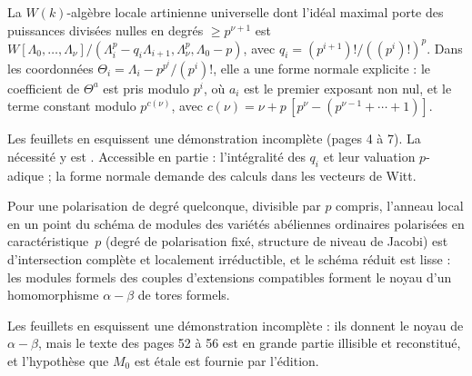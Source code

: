 \begin{encadre}
\begin{theoreme*}\nonverifie
La $W(k)$-algèbre locale artinienne universelle dont l'idéal maximal porte des puissances divisées nulles en degrés $\geq p^{\nu+1}$ est $W[\Lambda_0, \ldots, \Lambda_\nu]/(\Lambda_i^p - q_i\Lambda_{i+1}, \Lambda_\nu^p, \Lambda_0 - p)$, avec $q_i = (p^{i+1})!/((p^i)!)^p$. Dans les coordonnées $\Theta_i = \Lambda_i - p^{p^i}/(p^i)!$, elle a une forme normale explicite : le coefficient de $\Theta^a$ est pris modulo $p^i$, où $a_i$ est le premier exposant non nul, et le terme constant modulo $p^{c(\nu)}$, avec $c(\nu) = \nu + p\,[p^\nu - (p^{\nu-1} + \cdots + 1)]$.
\end{theoreme*}
\end{encadre}
{\small Les feuillets en esquissent une démonstration incomplète (pages 4 à 7). La nécessité y est . Accessible en partie : l'intégralité des $q_i$ et leur valuation $p$-adique ; la forme normale demande des calculs dans les vecteurs de Witt.\par}

\begin{encadre}
\begin{theoreme*}\nonverifie
Pour une polarisation de degré quelconque, divisible par $p$ compris, l'anneau local en un point du schéma de modules des variétés abéliennes ordinaires polarisées en caractéristique~$p$ (degré de polarisation fixé, structure de niveau de Jacobi) est d'intersection complète et localement irréductible, et le schéma réduit est lisse : les modules formels des couples d'extensions compatibles forment le noyau d'un homomorphisme $\alpha - \beta$ de tores formels.
\end{theoreme*}
\end{encadre}
{\small Les feuillets en esquissent une démonstration incomplète : ils donnent le noyau de $\alpha - \beta$, mais le texte des pages 52 à 56 est en grande partie illisible et reconstitué, et l'hypothèse que $M_0$ est étale est fournie par l'édition.\par}

